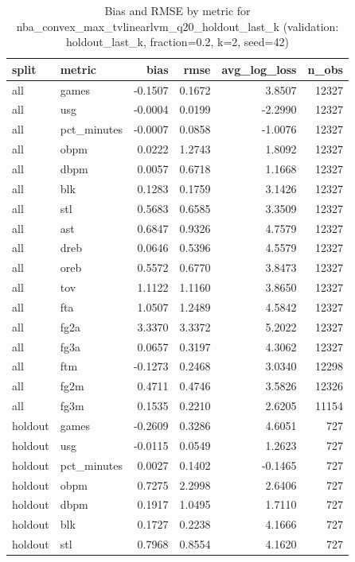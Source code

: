 \begin{table}
\caption{Bias and RMSE by metric for nba_convex_max_tvlinearlvm_q20_holdout_last_k (validation: holdout_last_k, fraction=0.2, k=2, seed=42)}
\label{tab:nba_convex_max_tvlinearlvm_q20_holdout_last_k_vs_holdout_last_k_f20_k2_s42_bias_rmse}
\begin{tabular}{llrrrr}
\toprule
split & metric & bias & rmse & avg\_log\_loss & n\_obs \\
\midrule
all & games & -0.1507 & 0.1672 & 3.8507 & 12327 \\
all & usg & -0.0004 & 0.0199 & -2.2990 & 12327 \\
all & pct\_minutes & -0.0007 & 0.0858 & -1.0076 & 12327 \\
all & obpm & 0.0222 & 1.2743 & 1.8092 & 12327 \\
all & dbpm & 0.0057 & 0.6718 & 1.1668 & 12327 \\
all & blk & 0.1283 & 0.1759 & 3.1426 & 12327 \\
all & stl & 0.5683 & 0.6585 & 3.3509 & 12327 \\
all & ast & 0.6847 & 0.9326 & 4.7579 & 12327 \\
all & dreb & 0.0646 & 0.5396 & 4.5579 & 12327 \\
all & oreb & 0.5572 & 0.6770 & 3.8473 & 12327 \\
all & tov & 1.1122 & 1.1160 & 3.8650 & 12327 \\
all & fta & 1.0507 & 1.2489 & 4.5842 & 12327 \\
all & fg2a & 3.3370 & 3.3372 & 5.2022 & 12327 \\
all & fg3a & 0.0657 & 0.3197 & 4.3062 & 12327 \\
all & ftm & -0.1273 & 0.2468 & 3.0340 & 12298 \\
all & fg2m & 0.4711 & 0.4746 & 3.5826 & 12326 \\
all & fg3m & 0.1535 & 0.2210 & 2.6205 & 11154 \\
holdout & games & -0.2609 & 0.3286 & 4.6051 & 727 \\
holdout & usg & -0.0115 & 0.0549 & 1.2623 & 727 \\
holdout & pct\_minutes & 0.0027 & 0.1402 & -0.1465 & 727 \\
holdout & obpm & 0.7275 & 2.2998 & 2.6406 & 727 \\
holdout & dbpm & 0.1917 & 1.0495 & 1.7110 & 727 \\
holdout & blk & 0.1727 & 0.2238 & 4.1666 & 727 \\
holdout & stl & 0.7968 & 0.8554 & 4.1620 & 727 \\

\end{tabular}
\end{table}
